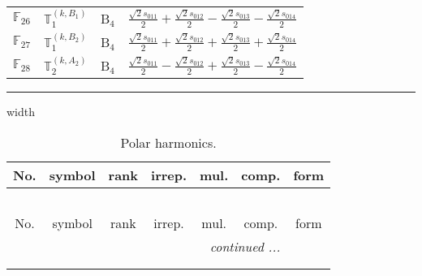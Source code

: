 \documentclass[fleqn,10pt,landscape]{article}
\begin{document}
\begin{itemize}
\begin{center}
\begin{longtable}{c|c|c|c}
$ \mathbb{F}_{26} $ & $\mathbb{T}_{1}^{(k,B_{1})}$ & B$_{4}$ & $\frac{\sqrt{2} s_{011}}{2} + \frac{\sqrt{2} s_{012}}{2} - \frac{\sqrt{2} s_{013}}{2} - \frac{\sqrt{2} s_{014}}{2}$ \\
$ \mathbb{F}_{27} $ & $\mathbb{T}_{1}^{(k,B_{2})}$ & B$_{4}$ & $\frac{\sqrt{2} s_{011}}{2} + \frac{\sqrt{2} s_{012}}{2} + \frac{\sqrt{2} s_{013}}{2} + \frac{\sqrt{2} s_{014}}{2}$ \\
$ \mathbb{F}_{28} $ & $\mathbb{T}_{2}^{(k,A_{2})}$ & B$_{4}$ & $\frac{\sqrt{2} s_{011}}{2} - \frac{\sqrt{2} s_{012}}{2} + \frac{\sqrt{2} s_{013}}{2} - \frac{\sqrt{2} s_{014}}{2}$ \\
\end{longtable}
\end{center}

 \hfil \hrule height 1mm width \textwidth \hfil

\begin{center}
\renewcommand{\arraystretch}{1.3}
\begin{longtable}{ccccccc}
\caption{Polar harmonics.}
 \\
 \hline \hline
No. & symbol & rank & irrep. & mul. & comp. & form \\ \hline \endfirsthead

\multicolumn{6}{l}{\tablename\ \thetable{}} \\
 \hline \hline
No. & symbol & rank & irrep. & mul. & comp. & form \\ \hline \endhead

 \hline \hline
\multicolumn{6}{r}{\footnotesize\it continued ...} \\ \endfoot

 \hline \hline
\multicolumn{6}{r}{} \\ \endlastfoot


\end{longtable}
\end{center}
\end{itemize}
\end{document}
